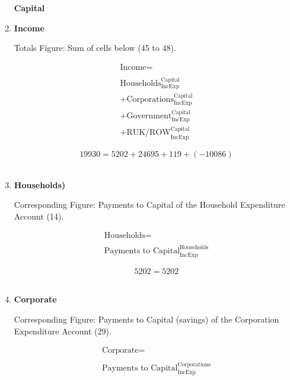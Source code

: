 \begin{enumerate}
\pagebreak


\begin{center}
\textbf{\LARGE Capital}
\end{center}

\item \textbf {Income}

Totals Figure: Sum of cells below (45 to 48).

\begin{equation}
\begin{split}
\text{Income} =  \\ \\
\text{Households}^\text{Capital}_\text{IncExp}\\
+\text{Corporations}^\text{Capital}_\text{IncExp}\\
+\text{Government}^\text{Capital}_\text{IncExp}\\
+\text{RUK/ROW}^\text{Capital}_\text{IncExp}
\end{split} \label{eq:2.5.48}
\end{equation}

\begin{equation} \nonumber
19930 = 5202+24695+119+(-10086)
\end{equation}\\


\item \textbf {Households)}

Corresponding Figure: Payments to Capital of the Household Expenditure Account (14).

\begin{equation}
\begin{split}
\text{Households} =  \\ \\
\text{Payments to Capital}^\text{Households}_\text{IncExp}
\end{split} \label{eq:2.5.49}
\end{equation}

\begin{equation} \nonumber
5202 = 5202
\end{equation}\\


\item \textbf {Corporate}

Corresponding Figure: Payments to Capital (savings) of the Corporation Expenditure Account (29).

\begin{equation}
\begin{split}
\text{Corporate} =  \\ \\
\text{Payments to Capital}^\text{Corporations}_\text{IncExp}
\end{split} \label{eq:2.5.50}
\end{equation}


\end{enumerate}
